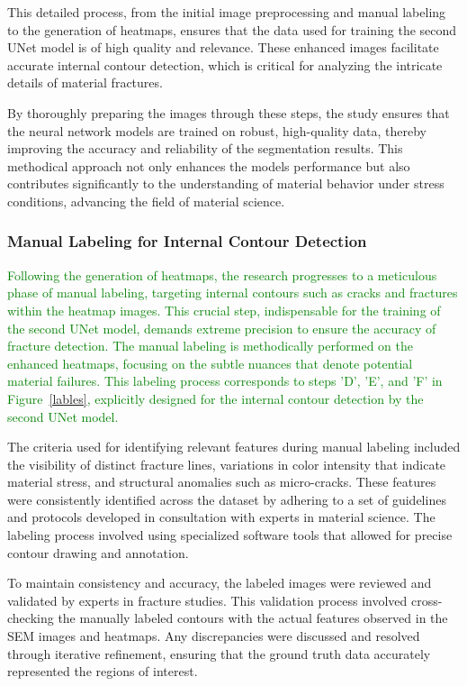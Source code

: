 \documentclass[preprint,12pt]{elsarticle}
\begin{document}
This detailed process, from the initial image preprocessing and manual labeling to the generation of heatmaps, ensures that the data used for training the second UNet model is of high quality and relevance. These enhanced images facilitate accurate internal contour detection, which is critical for analyzing the intricate details of material fractures.

By thoroughly preparing the images through these steps, the study ensures that the neural network models are trained on robust, high-quality data, thereby improving the accuracy and reliability of the segmentation results. This methodical approach not only enhances the models performance but also contributes significantly to the understanding of material behavior under stress conditions, advancing the field of material science.

\subsubsection{Manual Labeling for Internal Contour Detection}
\textcolor{green}{Following the generation of heatmaps, the research progresses to a meticulous phase of manual labeling, targeting internal contours such as cracks and fractures within the heatmap images. This crucial step, indispensable for the training of the second UNet model, demands extreme precision to ensure the accuracy of fracture detection. The manual labeling is methodically performed on the enhanced heatmaps, focusing on the subtle nuances that denote potential material failures. This labeling process corresponds to steps 'D', 'E', and 'F' in Figure~\ref{lables}, explicitly designed for the internal contour detection by the second UNet model. }

The criteria used for identifying relevant features during manual labeling included the visibility of distinct fracture lines, variations in color intensity that indicate material stress, and structural anomalies such as micro-cracks. These features were consistently identified across the dataset by adhering to a set of guidelines and protocols developed in consultation with experts in material science. The labeling process involved using specialized software tools that allowed for precise contour drawing and annotation.

To maintain consistency and accuracy, the labeled images were reviewed and validated by experts in fracture studies. This validation process involved cross-checking the manually labeled contours with the actual features observed in the SEM images and heatmaps. Any discrepancies were discussed and resolved through iterative refinement, ensuring that the ground truth data accurately represented the regions of interest.
\end{document}
